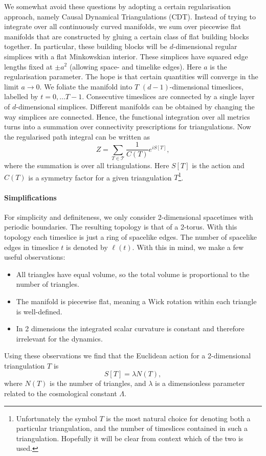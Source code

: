 We somewhat avoid these questions by adopting a certain regularisation approach, namely Causal Dynamical Triangulations (CDT). Instead of trying to integrate over all continuously curved manifolds, we sum over piecewise flat manifolds that are constructed by gluing a certain class of flat building blocks together. In particular, these building blocks will be $d$-dimensional regular simplices with a flat Minkowskian interior. These simplices have squared edge lengths fixed at $\pm a^2$ (allowing space- and timelike edges). Here $a$ is the regularisation parameter. The hope is that certain quantities will converge in the limit $a \to 0$. We foliate the manifold into $T$ $(d - 1)$-dimensional timeslices, labelled by $t = 0, \ldots T - 1$. Consecutive timeslices are connected by a single layer of $d$-dimensional simplices. Different manifolds can be obtained by changing the way simplices are connected. Hence, the functional integration over all metrics turns into a summation over connectivity prescriptions for triangulations. Now the regularised path integral can be written as
\begin{equation}
    Z
    =
    \sum_{T \in \mathcal{T}} \frac{1}{C(T)} e^{i S[T]}
    ,
\end{equation}
where the summation is over all triangulations. Here $S[T]$ is the action and $C(T)$ is a symmetry factor for a given triangulation $T$\footnote{Unfortunately the symbol $T$ is the most natural choice for denoting both a particular triangulation, and the number of timeslices contained in such a triangulation. Hopefully it will be clear from context which of the two is used.}.

\paragraph{Simplifications} For simplicity and definiteness, we only consider 2-dimensional spacetimes with periodic boundaries. The resulting topology is that of a 2-torus. With this topology each timeslice is just a ring of spacelike edges. The number of spacelike edges in timeslice $t$ is denoted by $\ell(t)$. With this in mind, we make a few useful observations:
\begin{itemize}
    \item All triangles have equal volume, so the total volume is proportional to the number of triangles.
    \item The manifold is piecewise flat, meaning a Wick rotation within each triangle is well-defined.
    \item In 2 dimensions the integrated scalar curvature is constant and therefore irrelevant for the dynamics.
\end{itemize}
Using these observations we find that the Euclidean action for a 2-dimensional triangulation $T$ is \cite{2012}
\begin{equation}
    S[T] = \lambda N(T),
\end{equation}
where $N(T)$ is the number of triangles, and $\lambda$ is a dimensionless parameter related to the cosmological constant $\Lambda$.

